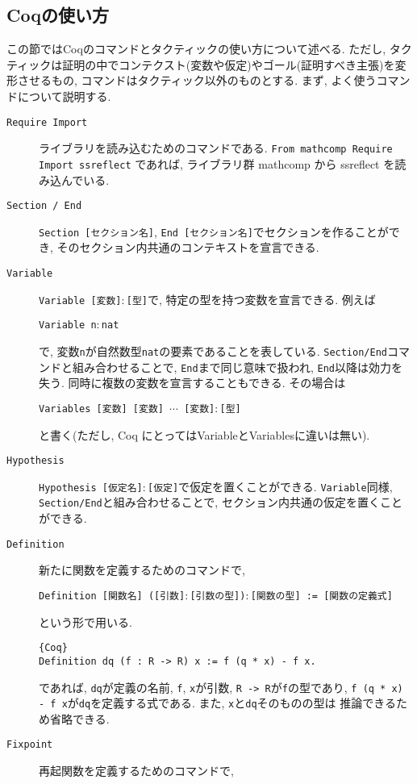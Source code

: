 \documentclass[11pt]{jsreport}
\theoremstyle{mystyle}
\newcommand{\0}{\textbf{0}}
\begin{document}
\subsection{Coqの使い方} \label{ssec coq_use}
この節ではCoqのコマンドとタクティックの使い方について述べる. ただし, タクティックは証明の中でコンテクスト(変数や仮定)やゴール(証明すべき主張)を変形させるもの, コマンドはタクティック以外のものとする. 
まず, よく使うコマンドについて説明する. 
\begin{description}
  \item[\tt Require Import]
    ライブラリを読み込むためのコマンドである.
    {\tt From mathcomp Require Import ssreflect}
    であれば, ライブラリ群 mathcomp から ssreflect を読み込んでいる.
  \item[\tt Section / End]
    {\tt Section [セクション名]}, {\tt End [セクション名]}でセクションを作ることができ, 
    そのセクション内共通のコンテキストを宣言できる. 
  \item[\tt Variable]
    {\tt Variable [変数]$\colon$[型]}で, 特定の型を持つ変数を宣言できる. 例えば
    
    {\tt Variable n$\colon$nat}
    
    で, 変数{\tt n}が自然数型{\tt nat}の要素であることを表している. 
    {\tt Section/End}コマンドと組み合わせることで, {\tt End}まで同じ意味で扱われ, 
    {\tt End}以降は効力を失う. 
    同時に複数の変数を宣言することもできる. その場合は
    
    {\tt Variables [変数] [変数] $\cdots$ [変数]$\colon$[型]}
    
    と書く(ただし, Coq にとっては{Variable}と{Variables}に違いは無い).    
  \item[\tt Hypothesis]
    {\tt Hypothesis [仮定名]$\colon$[仮定]}で仮定を置くことができる. {\tt Variable}同様, 
    {\tt Section/End}と組み合わせることで, セクション内共通の仮定を置くことができる. 
  \item[\tt Definition]
    新たに関数を定義するためのコマンドで,
    
    {\tt Definition [関数名] ([引数]$\colon$[引数の型])$\colon$[関数の型] := 
    [関数の定義式]}
    
    という形で用いる. 
    \begin{lstlisting}{Coq}
Definition dq (f : R -> R) x := f (q * x) - f x. \end{lstlisting}
    であれば, {\tt dq}が定義の名前, {\tt f}, {\tt x}が引数, {\tt R -> R}が{\tt f}の型であり, 
    {\tt f (q * x) - f x}が{\tt dq}を定義する式である. また, {\tt x}と{\tt dq}そのものの型は
    推論できるため省略できる. 
  \item[\tt Fixpoint]
    再起関数を定義するためのコマンドで, 
    

\end{description}
\end{document}
